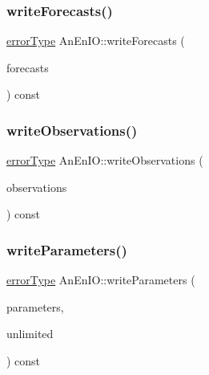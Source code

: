 \mbox{\label{class_an_en_i_o_abc5b12bc4692f3ac303fa5430aecaf4c}} 
\subsubsection{\texorpdfstring{write\+Forecasts()}{writeForecasts()}}
{\footnotesize\ttfamily \mbox{\hyperlink{class_an_en_i_o_aa56bc1ec6610b86db4349bce20f9ead0}{error\+Type}} An\+En\+I\+O\+::write\+Forecasts (\begin{DoxyParamCaption}\item[{const \mbox{\hyperlink{class_forecasts}{Forecasts}} \&}]{forecasts }\end{DoxyParamCaption}) const}

\mbox{\label{class_an_en_i_o_ae89350e02d93439e79aa76068062490a}} 
\subsubsection{\texorpdfstring{write\+Observations()}{writeObservations()}}
{\footnotesize\ttfamily \mbox{\hyperlink{class_an_en_i_o_aa56bc1ec6610b86db4349bce20f9ead0}{error\+Type}} An\+En\+I\+O\+::write\+Observations (\begin{DoxyParamCaption}\item[{const \mbox{\hyperlink{class_observations}{Observations}} \&}]{observations }\end{DoxyParamCaption}) const}

\mbox{\label{class_an_en_i_o_a9ae88d089b2de16571085cb6f7f4cefb}} 
\subsubsection{\texorpdfstring{write\+Parameters()}{writeParameters()}}
{\footnotesize\ttfamily \mbox{\hyperlink{class_an_en_i_o_aa56bc1ec6610b86db4349bce20f9ead0}{error\+Type}} An\+En\+I\+O\+::write\+Parameters (\begin{DoxyParamCaption}\item[{const \mbox{\hyperlink{classanen_par_1_1_parameters}{anen\+Par\+::\+Parameters}} \&}]{parameters,  }\item[{bool}]{unlimited }\end{DoxyParamCaption}) const}

